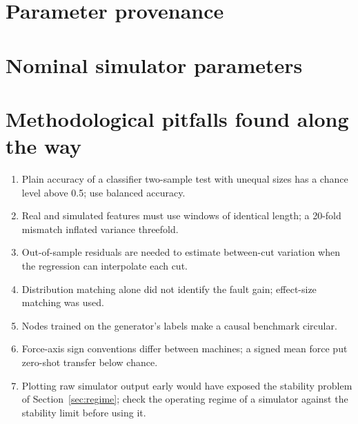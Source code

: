 \documentclass[11pt]{article}
\begin{document}
\appendix
\section{Parameter provenance}\label{app:registry}
\begin{table}[h]\centering\small
\caption{Every simulator parameter, its tier (fixed / range / learned / assumed) and verification status.}

\end{table}

\section{Nominal simulator parameters}\label{app:simparams}
\begin{table}[h]\centering\small
\caption{Nominal values and numerical search bounds of the 16 simulator parameter groups (\texttt{cutting\_sim/model\_v4.py}). The bounds are numerical, not claims from the literature. Fixed quantities: 2 flutes, $D{=}6.35$~mm, $\beta{=}30^\circ$, $a_p{=}38.1$~mm, $N_z{=}8$, $\Delta t{=}1/25\,600$~s, $h_{\max}{=}0.3$~mm.}

\end{table}

\section{Methodological pitfalls found along the way}
\begin{enumerate}
\item Plain accuracy of a classifier two-sample test with unequal sizes has a chance level above 0.5; use balanced accuracy.
\item Real and simulated features must use windows of identical length; a 20-fold mismatch inflated variance threefold.
\item Out-of-sample residuals are needed to estimate between-cut variation when the regression can interpolate each cut.
\item Distribution matching alone did not identify the fault gain; effect-size matching was used.
\item Nodes trained on the generator's labels make a causal benchmark circular.
\item Force-axis sign conventions differ between machines; a signed mean force put zero-shot transfer below chance.
\item Plotting raw simulator output early would have exposed the stability problem of Section~\ref{sec:regime}; check the operating regime of a simulator against the stability limit before using it.
\end{enumerate}
\end{document}
